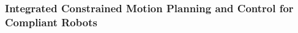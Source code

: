 
\subsubsection{Integrated Constrained Motion Planning and Control for
Compliant Robots}
\label{sec:ConstrainedMotionPlanningAndControl} 